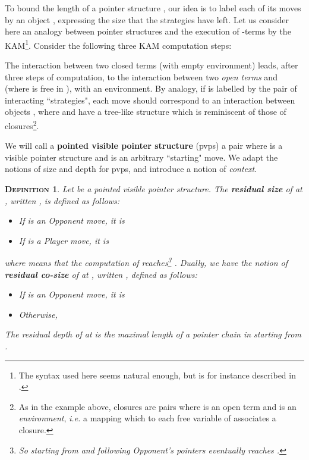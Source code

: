 \documentclass{article}
\newtheorem{definition}{\textsc{Definition}}
\begin{document}
To bound the length of a pointer structure , our idea is to label each of its moves  by an object , expressing the size that the strategies have left. Let us consider
here an analogy between pointer structures and the execution of -terms by the KAM\footnote{The syntax used here seems natural enough, but is for instance described in \cite{phd}.}.
Consider the following three KAM computation steps:

The interaction between two closed terms (with empty environment) leads, after three steps of computation, to the interaction between two \emph{open terms}
 and  (where  is free in ), with an environment. By analogy, if  is labelled by the pair  of interacting ``strategies", each move 
should correspond to an interaction between objects , where  and  have a tree-like structure which is reminiscent of those of closures\footnote{As in the example above, closures
are pairs  where  is an open term and  is an \emph{environment}, \emph{i.e.} a mapping which to each free variable of  associates a closure.}.

We will call a \textbf{pointed visible pointer structure} (pvps) a pair  where  is a visible pointer structure and 
is an arbitrary ``starting" move. We adapt the notions of size and depth for pvps, and introduce a notion of \emph{context}. 


\begin{definition}
Let  be a pointed visible pointer structure. The \textbf{residual size} of  at , written , is defined as follows:
\begin{itemize}
\item If  is an Opponent move, it is 
\item If  is a Player move, it is 
\end{itemize}
where  means that the computation of  reaches\footnote{So starting from  and following Opponent's pointers
eventually reaches .} . Dually, we have the notion of
\textbf{residual co-size} of  at , written , defined as follows:
\begin{itemize}
\item If  is an Opponent move, it is 
\item Otherwise, 
\end{itemize}
The \emph{residual depth} of  at  is the maximal length of a pointer chain in  starting from .
\end{definition}
\end{document}
